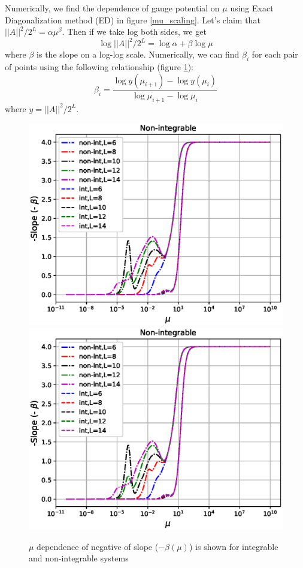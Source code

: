 \documentclass[11pt,a4paper]{article}
\begin{document}
Numerically, we find the dependence of gauge potential on $\mu$ using Exact Diagonalization method (ED) in figure \ref{mu_scaling}. Let's claim that $||A||^2/2^L=\alpha\mu^{\beta}$. Then if we take log both sides, we get
\begin{equation}
\log ||A||^2/2^L=\log \alpha+ \beta \log \mu
\end{equation}
where $\beta$ is the slope on a log-log scale. Numerically, we can find $\beta_i$ for each pair of points using the following relationship (figure \ref{slope_nonintegrable_mu}):
\begin{equation}
\beta_i=\dfrac{\log y( \mu_{i+1}) -\log y( \mu_{i})} {\log \mu_{i+1}-\log \mu_{i}}
\end{equation}
where $y= ||A||^2/2^L$. 
\begin{figure}[!ht]
\begin{center}
\includegraphics[scale=0.7]{new_pics/v3_slope_nonint_int_compare_semilogx.eps}\\
\includegraphics[scale=0.7]{new_pics/v3_slope_nonint_int_compare_semilogx.eps}\\
\caption{$\mu$ dependence of negative of slope ($-\beta (\mu)$) is shown for  integrable and non-integrable systems }
\label{slope_nonintegrable_mu}
\end{center}
\end{figure}
\end{document}
